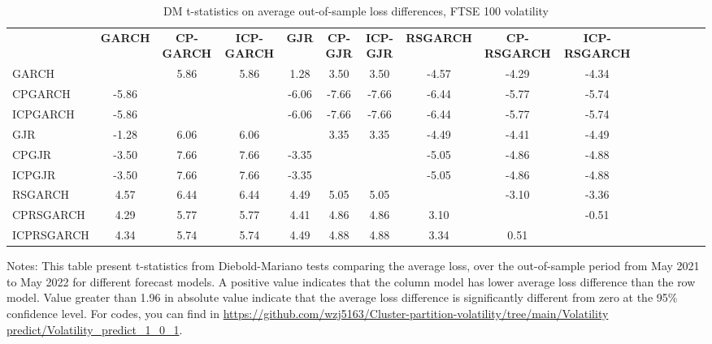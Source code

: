 \documentclass[preprint,12pt,authoryear]{elsarticle}
\begin{document}
\begin{table}
\begin{center}
\begin{threeparttable}
\centering \footnotesize
\caption{\footnotesize DM t-statistics on average out-of-sample loss differences, FTSE 100 volatility}\label{tab38_2}
\begin{tabular}{l c c c c c c c c c c c c c c c}
\toprule
 & \textbf{GARCH} & \textbf{CP-GARCH} & \textbf{ICP-GARCH} & \textbf{GJR} & \textbf{CP-GJR} & \textbf{ICP-GJR}& \textbf{RSGARCH} & \textbf{CP-RSGARCH} & \textbf{ICP-RSGARCH}
 \\
\cmidrule{2-10}
GARCH      &       & 5.86 & 5.86 &  1.28 &  3.50 &  3.50 & -4.57 & -4.29 & -4.34 \\
CPGARCH    & -5.86 &      &      & -6.06 & -7.66 & -7.66 & -6.44 & -5.77 & -5.74 \\
ICPGARCH   & -5.86 &      &      & -6.06 & -7.66 & -7.66 & -6.44 & -5.77 & -5.74 \\
GJR        & -1.28 & 6.06 & 6.06 &       &  3.35 &  3.35 & -4.49 & -4.41 & -4.49 \\
CPGJR      & -3.50 & 7.66 & 7.66 & -3.35 &       &       & -5.05 & -4.86 & -4.88 \\
ICPGJR     & -3.50 & 7.66 & 7.66 & -3.35 &       &       & -5.05 & -4.86 & -4.88 \\
RSGARCH    &  4.57 & 6.44 & 6.44 &  4.49 &  5.05 &  5.05 &       & -3.10 & -3.36 \\
CPRSGARCH  &  4.29 & 5.77 & 5.77 &  4.41 &  4.86 &  4.86 &  3.10 &       & -0.51 \\
ICPRSGARCH &  4.34 & 5.74 & 5.74 &  4.49 &  4.88 &  4.88 &  3.34 &  0.51 &       \\
\bottomrule
\end{tabular}
Notes: This table present t-statistics from Diebold-Mariano tests comparing the average loss, over the out-of-sample period from May 2021 to May 2022 for different forecast models. A positive value indicates that the column model has lower average loss difference than the row model. Value greater than 1.96 in absolute value indicate that the average loss difference is significantly different from zero at the 95\% confidence level.
For codes, you can find in
\url{https://github.com/wzj5163/Cluster-partition-volatility/tree/main/Volatility predict/Volatility_predict_1_0_1}.
\end{threeparttable}
\end{center}
\end{table}
\end{document}
